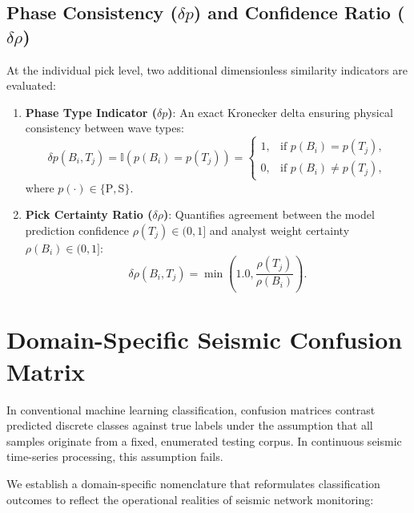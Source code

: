\subsection{Phase Consistency ($\delta p$) and Confidence Ratio ($\delta \rho$)}
At the individual pick level, two additional dimensionless similarity indicators are evaluated:
\begin{enumerate}
  \item \textbf{Phase Type Indicator ($\delta p$)}: An exact Kronecker delta ensuring physical consistency between wave types:
  \begin{equation}
    \delta p(B_i, T_j) = \mathbb{I}\left( p(B_i) = p(T_j) \right) = \begin{cases}
      1, & \text{if } p(B_i) = p(T_j), \\
      0, & \text{if } p(B_i) \neq p(T_j),
    \end{cases}
  \end{equation}
  where $p(\cdot) \in \{\mathrm{P}, \mathrm{S}\}$.
  \item \textbf{Pick Certainty Ratio ($\delta \rho$)}: Quantifies agreement between the model prediction confidence $\rho(T_j) \in (0, 1]$ and analyst weight certainty $\rho(B_i) \in (0, 1]$:
  \begin{equation}
    \delta \rho(B_i, T_j) = \min\left( 1.0, \frac{\rho(T_j)}{\rho(B_i)} \right).
  \end{equation}
\end{enumerate}

\section{Domain-Specific Seismic Confusion Matrix}
\label{sec:confusion_matrix}

In conventional machine learning classification, confusion matrices contrast predicted discrete classes against true labels under the assumption that all samples originate from a fixed, enumerated testing corpus. In continuous seismic time-series processing, this assumption fails.

We establish a domain-specific nomenclature that reformulates classification outcomes to reflect the operational realities of seismic network monitoring:

